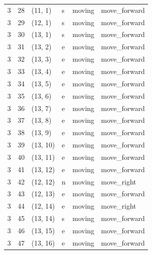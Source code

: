 \documentclass[12pt, a4paper]{llncs}
\begin{document}
\begin{table}[htbp]
\begin{tabular}{llllll}
3 & 28 & (11, 1) & s & moving & move\_forward \\
3 & 29 & (12, 1) & s & moving & move\_forward \\
3 & 30 & (13, 1) & s & moving & move\_forward \\
3 & 31 & (13, 2) & e & moving & move\_forward \\
3 & 32 & (13, 3) & e & moving & move\_forward \\
3 & 33 & (13, 4) & e & moving & move\_forward \\
3 & 34 & (13, 5) & e & moving & move\_forward \\
3 & 35 & (13, 6) & e & moving & move\_forward \\
3 & 36 & (13, 7) & e & moving & move\_forward \\
3 & 37 & (13, 8) & e & moving & move\_forward \\
3 & 38 & (13, 9) & e & moving & move\_forward \\
3 & 39 & (13, 10) & e & moving & move\_forward \\
3 & 40 & (13, 11) & e & moving & move\_forward \\
3 & 41 & (13, 12) & e & moving & move\_forward \\
3 & 42 & (12, 12) & n & moving & move\_right \\
3 & 43 & (12, 13) & e & moving & move\_forward \\
3 & 44 & (12, 14) & e & moving & move\_right \\
3 & 45 & (13, 14) & s & moving & move\_forward \\
3 & 46 & (13, 15) & e & moving & move\_forward \\
3 & 47 & (13, 16) & e & moving & move\_forward \\
    \bottomrule
  \end{tabular}
\end{table}
\end{document}
